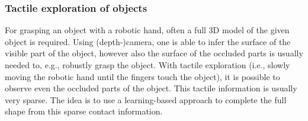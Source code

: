 \documentclass[a4paper]{article}
\begin{document}


\subsubsection{Tactile exploration of objects}
For grasping an object with a robotic hand, often a full 3D model of the given object is required.
Using (depth-)camera, one is able to infer the surface of the visible part of the object, however also the surface of the occluded parts is usually needed to, e.g., robustly grasp the object.
With tactile exploration (i.e., slowly moving the robotic hand until the fingers touch the object), it is possible to observe even the occluded parts of the object.
This tactile information is usually very sparse. The idea is to use a learning-based approach to complete the full shape from this sparse contact information.
\end{document}
